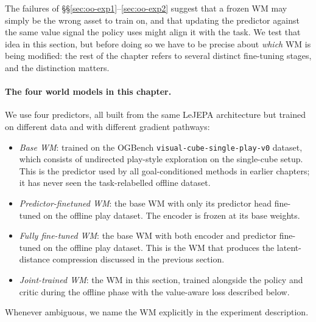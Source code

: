 The failures of \S\S\ref{sec:oo-exp1}--\ref{sec:oo-exp2} suggest that a frozen WM may simply be the wrong asset to train on, and that updating the predictor against the same value signal the policy uses might align it with the task. We test that idea in this section, but before doing so we have to be precise about \emph{which} WM is being modified: the rest of the chapter refers to several distinct fine-tuning stages, and the distinction matters.

\paragraph{The four world models in this chapter.} We use four predictors, all built from the same LeJEPA architecture but trained on different data and with different gradient pathways:
\begin{itemize}
    \item \emph{Base WM}: trained on the OGBench \texttt{visual-cube-single-play-v0} dataset, which consists of undirected play-style exploration on the single-cube setup. This is the predictor used by all goal-conditioned methods in earlier chapters; it has never seen the task-relabelled offline dataset.
    \item \emph{Predictor-finetuned WM}: the base WM with only its predictor head fine-tuned on the offline play dataset. The encoder is frozen at its base weights.
    \item \emph{Fully fine-tuned WM}: the base WM with both encoder and predictor fine-tuned on the offline play dataset. This is the WM that produces the latent-distance compression discussed in the previous section.
    \item \emph{Joint-trained WM}: the WM in this section, trained alongside the policy and critic during the offline phase with the value-aware loss described below.
\end{itemize}
Whenever ambiguous, we name the WM explicitly in the experiment description.

